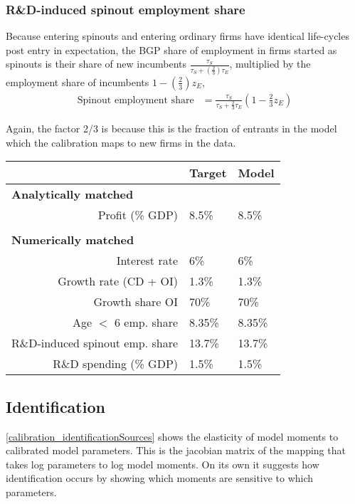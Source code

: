 \documentclass[11pt,english]{article}
\theoremstyle{remark}
\begin{document}
\subsubsection{R\&D-induced spinout employment share}

Because entering spinouts and entering ordinary firms have identical life-cycles post entry in expectation, the BGP share of employment in firms started as spinouts is their share of new incumbents $\frac{\tau_S}{\tau_S+ (\frac{2}{3})\tau_E}$, multiplied by the employment share of incumbents $1- (\frac{2}{3})z_E$, 
\begin{align*}
	\textrm{Spinout employment share} &= \frac{\tau_S}{\tau_S + \frac{2}{3}\tau_E} (1 - \frac{2}{3}z_E) 
\end{align*}

Again, the factor 2/3 is because this is the fraction of entrants in the model which the calibration maps to new firms in the data.


\begin{table}[]
	\centering
	\label{calibration_targets}
	\begin{tabular}{rll}
		\toprule \toprule
		& Target & Model \tabularnewline
		\midrule
		\multicolumn{1}{l}{\textbf{Analytically matched}} & & 
		\tabularnewline
		Profit (\% GDP) & 8.5\% & 8.5\% 
		\tabularnewline
		\tabularnewline
		\multicolumn{1}{l}{\textbf{Numerically matched}} & & 
		\tabularnewline
		Interest rate & 6\% & 6\% 
		\tabularnewline
		Growth rate (CD + OI) & 1.3\% & 1.3\%
		\tabularnewline		
		Growth share OI & 70\% & 70\%
		\tabularnewline
		Age $<$ 6 emp. share  & 8.35\% & 8.35\%
		\tabularnewline
		R\&D-induced spinout emp. share & 13.7\% & 13.7\%
		\tabularnewline
		R\&D spending (\% GDP) & 1.5\% & 1.5\%
		\tabularnewline
		\bottomrule
	\end{tabular}
\end{table}

\normalsize

\subsection{Identification}

\autoref{calibration_identificationSources} shows the elasticity of model moments to calibrated model parameters. This is the jacobian matrix of the mapping that takes log parameters to log model moments. On its own it suggests how identification occurs by showing which moments are sensitive to which parameters. 
\end{document}
